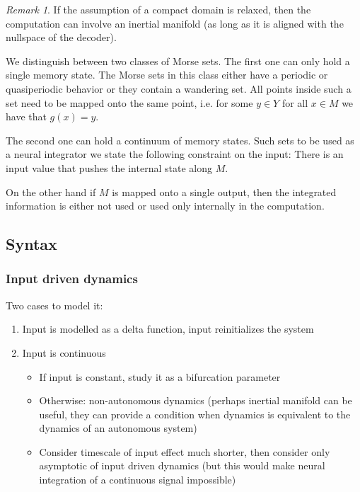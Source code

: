 \documentclass{scrartcl}
\theoremstyle{definition}
\theoremstyle{remark}
\newtheorem{remark}{Remark}
\begin{document}
\begin{remark}
If the assumption of a compact domain is relaxed, then the computation can involve an inertial manifold (as long as it is aligned with the nullspace of the decoder).
\end{remark}

We distinguish between two classes of Morse sets.
The first one can only hold a single memory state. 
The Morse sets in this class either have a periodic or quasiperiodic behavior or they contain a wandering set.
All points inside such a set need to be mapped onto the same point, i.e. for some $y\in Y$ for all $x\in M$ we have that $g(x)=y$.

The second one can hold a continuum of memory states. %
Such sets to be used as a neural integrator we state the following constraint on the input:
There is an input value that pushes the internal state along $M$.

On the other hand if $M$ is  mapped onto a single output, then the integrated information is either not used or used only internally in the computation.

\subsection{Syntax}%

\subsubsection{Input driven dynamics}
Two cases to model it:
\begin{enumerate}
\item Input is modelled as a delta function, input reinitializes the system
\item Input is continuous 
\begin{itemize}
\item If input is constant, study it as a bifurcation parameter
\item Otherwise: non-autonomous dynamics (perhaps inertial manifold can be useful, they can provide a condition when dynamics is equivalent to the dynamics of an autonomous system)
\item Consider timescale of input effect much shorter, then consider only asymptotic of input driven dynamics (but this would make neural integration of a continuous signal impossible)
\end{itemize}
\end{enumerate}
\end{document}
